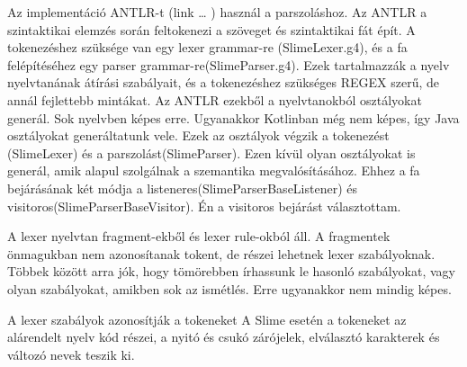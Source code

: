 Az implementáció ANTLR-t (link … ) használ a parszoláshoz. 
Az ANTLR a szintaktikai elemzés során feltokenezi a szöveget és szintaktikai fát épít. 
A tokenezéshez szüksége van egy lexer grammar-re (SlimeLexer.g4), és a fa felépítéséhez egy parser grammar-re(SlimeParser.g4). 
Ezek tartalmazzák a nyelv nyelvtanának átírási szabályait, és a tokenezéshez szükséges REGEX szerű, de annál fejlettebb mintákat. 
Az ANTLR ezekből a nyelvtanokból osztályokat generál. 
Sok nyelvben képes erre. 
Ugyanakkor Kotlinban még nem képes, így Java osztályokat generáltatunk vele. 
Ezek az osztályok végzik a tokenezést (SlimeLexer) és a parszolást(SlimeParser). 
Ezen kívül olyan osztályokat is generál, amik alapul szolgálnak a  szemantika megvalósításához. 
Ehhez a fa bejárásának két módja a listeneres(SlimeParserBaseListener) és visitoros(SlimeParserBaseVisitor).
Én a visitoros bejárást választottam.

A lexer nyelvtan fragment-ekből és lexer rule-okból áll. 
A fragmentek önmagukban nem azonosítanak tokent, de részei lehetnek lexer szabályoknak. 
Többek között arra jók, hogy tömörebben írhassunk le hasonló szabályokat, vagy olyan szabályokat, amikben sok az ismétlés. 
Erre ugyanakkor nem mindig képes.

A lexer szabályok azonosítják a tokeneket
A Slime esetén a tokeneket az alárendelt nyelv kód részei, a nyitó és csukó zárójelek, elválasztó karakterek és változó nevek teszik ki.

